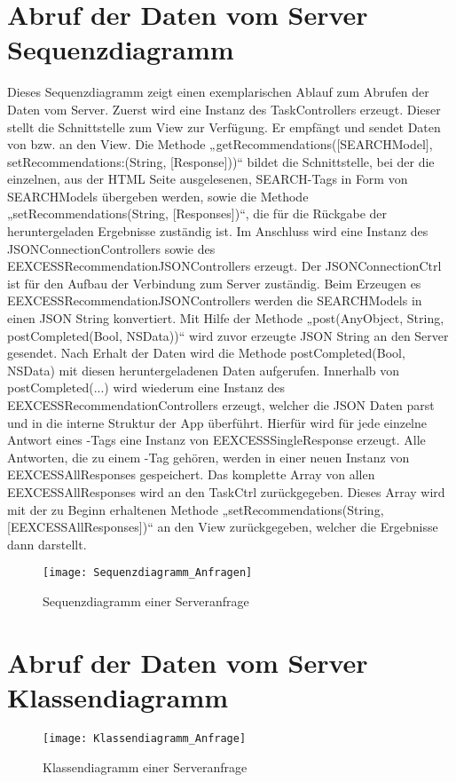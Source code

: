 \section{Abruf der Daten vom Server Sequenzdiagramm}

Dieses Sequenzdiagramm zeigt einen exemplarischen Ablauf zum Abrufen der Daten vom Server. Zuerst wird eine Instanz des TaskControllers erzeugt. Dieser stellt die Schnittstelle zum View zur Verfügung. Er empfängt und sendet Daten von bzw. an den View. Die Methode „getRecommendations([SEARCHModel], setRecommendations:(String, [Response]))“ bildet die Schnittstelle, bei der die einzelnen, aus der HTML Seite ausgelesenen, SEARCH-Tags in Form von SEARCHModels übergeben werden, sowie die Methode „setRecommendations(String, [Responses])“, die für die Rückgabe der heruntergeladen Ergebnisse zuständig ist. Im Anschluss wird eine Instanz des JSONConnectionControllers sowie des EEXCESSRecommendationJSONControllers erzeugt. Der JSONConnectionCtrl ist für den Aufbau der Verbindung zum Server zuständig. Beim Erzeugen es EEXCESSRecommendationJSONControllers werden die SEARCHModels in einen JSON String konvertiert. Mit Hilfe der Methode „post(AnyObject, String, postCompleted(Bool, NSData))“ wird zuvor erzeugte JSON String an den Server gesendet. Nach Erhalt der Daten wird die Methode postCompleted(Bool, NSData) mit diesen heruntergeladenen Daten aufgerufen. Innerhalb von 
postCompleted(...) wird wiederum eine Instanz des EEXCESSRecommendationControllers erzeugt, welcher die JSON Daten parst und in die interne Struktur der App überführt. Hierfür wird für jede einzelne Antwort eines \SEARCH-Tags eine Instanz von EEXCESSSingleResponse erzeugt. Alle Antworten, die zu einem \SEARCH-Tag gehören, werden in einer neuen Instanz von EEXCESSAllResponses gespeichert.  Das komplette Array von allen EEXCESSAllResponses wird an den TaskCtrl zurückgegeben. Dieses Array wird mit der zu Beginn erhaltenen Methode „setRecommendations(String, [EEXCESSAllResponses])“ an den View zurückgegeben, welcher die Ergebnisse dann darstellt. 

\begin{figure}[h]
	\centering
	\texttt{[image: Sequenzdiagramm\_Anfragen]}
	\caption{Sequenzdiagramm einer Serveranfrage}
	\label{fig:Anfrage Sequenzdiagramm}
\end{figure}

\section{Abruf der Daten vom Server Klassendiagramm}

\begin{figure}[h]
	\centering
	\texttt{[image: Klassendiagramm\_Anfrage]}
	\caption{Klassendiagramm einer Serveranfrage}
	\label{fig:Anfrage Klassendiagramm}
\end{figure}
